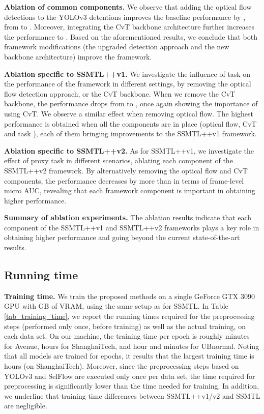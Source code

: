 \documentclass[times,twocolumn,final,authoryear]{elsarticle}
\begin{document}
\noindent
{\bf Ablation of common components.} We observe that adding the optical flow detections to the YOLOv3 detentions improves the baseline performance by , from  to . Moreover, integrating the CvT backbone architecture further increases the performance to . Based on the aforementioned results, we conclude that both framework modifications (the upgraded detection approach and the new backbone architecture) improve the framework.

\noindent
{\bf Ablation specific to SSMTL++v1.}
We investigate the influence of task  on the performance of the framework in different settings, by removing the optical flow detection approach, or the CvT backbone. When we remove the CvT backbone, the performance drops from  to , once again showing the importance of using CvT. We observe a similar effect when removing optical flow.  
The highest performance is obtained when all the components are in place (optical flow, CvT and task ), each of them bringing improvements to the SSMTL++v1 framework.
 
\noindent
{\bf Ablation specific to SSMTL++v2.}
As for SSMTL++v1, we investigate the effect of proxy task  in different scenarios, ablating each component of the SSMTL++v2 framework. By alternatively removing the optical flow and CvT components, the performance decreases by more than  in terms of frame-level micro AUC, revealing that each framework component is important in obtaining higher performance.

\noindent
{\bf Summary of ablation experiments.}
The ablation results indicate that each component of the SSMTL++v1 and SSMTL++v2 frameworks plays a key role in obtaining higher performance and going beyond the current state-of-the-art results.

\subsection{Running time}

\noindent 
{\bf Training time.} We train the proposed methods on a single GeForce GTX 3090 GPU with  GB of VRAM, using the same setup as for SSMTL. In Table \ref{tab_training_time}, we report the running times required for the preprocessing steps (performed only once, before training) as well as the actual training, on each data set. On our machine, the training time per epoch is roughly  minutes for Avenue,  hours for ShanghaiTech, and  hour and  minutes for UBnormal. Noting that all models are trained for  epochs, it results that the largest training time is  hours (on ShanghaiTech). Moreover, since the preprocessing steps based on YOLOv3 and SelFlow are executed only once per data set, the time required for preprocessing is significantly lower than the time needed for training.
In addition, we underline that training time differences between SSMTL++v1/v2 and SSMTL are negligible. 
\end{document}
